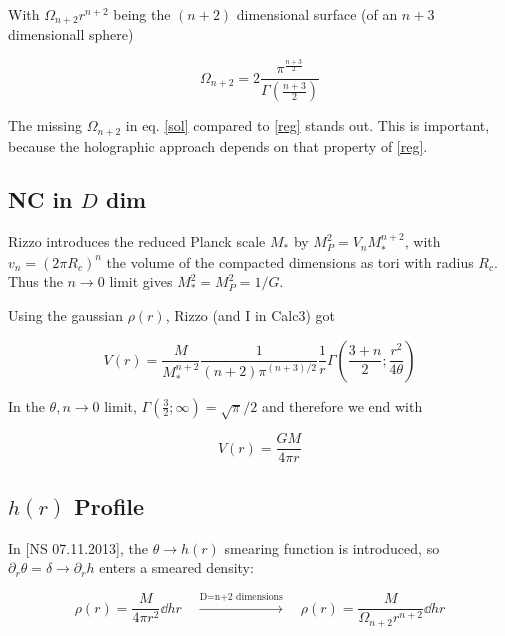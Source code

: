 \documentclass[10pt,a4paper, fleqn]{article}
\begin{document}
With $\Omega_{n+2}r^{n+2}$ being the $(n+2)$ dimensional surface (of an ${n+3}$ dimensionall sphere)

\begin{equation}
\Omega_{n+2} = 2 \frac{\pi^\frac{n+3}{2}}{\Gamma\left(\frac{n+3}{2}\right)}
\end{equation}

The missing $\Omega_{n+2}$ in eq. \ref{sol} compared to \ref{reg} stands out. This is important, because the holographic approach depends on that property of \ref{reg}.

\subsection{NC in $D$ dim}
Rizzo introduces the reduced Planck scale $M_*$ by $M_P^2 = V_n M_*^{n+2}$, with $v_n = (2 \pi R_c)^n$ the volume of the compacted dimensions as tori with radius $R_c$. Thus the $n\to 0$ limit gives $M_*^2 = M_P^2 = 1 / G$.


Using the gaussian $\rho(r)$, Rizzo (and I in Calc3) got

\begin{equation}
V(r) = \frac{M}{M_*^{n+2}} \frac{1}{(n+2) \pi^{(n+3)/2}} \frac{1}{r} \Gamma\left( \frac{3+n}{2} ; \frac{r^2}{4 \theta} \right)
\end{equation}

In the $\theta,n \to 0$ limit, $\Gamma(\frac{3}{2}; \infty) = \sqrt{\pi}/2$ and therefore we end with

\begin{equation}
V(r) = \frac{GM}{4 \pi r }
\end{equation}

\subsection{$h(r)$ Profile}
In [NS 07.11.2013], the $\theta \to h(r)$ smearing function is introduced, so $\partial_r \theta = \delta \to \partial_r h$ enters a smeared density:

\begin{equation}
\rho(r) = \frac{M}{4 \pi r^2} \dd{h}{r}
\quad \xrightarrow{\text{D=n+2 dimensions}} \quad
\rho(r) = \frac{M}{\Omega_{n+2} r^{n+2}} \dd{h}{r}
\end{equation}
\end{document}
